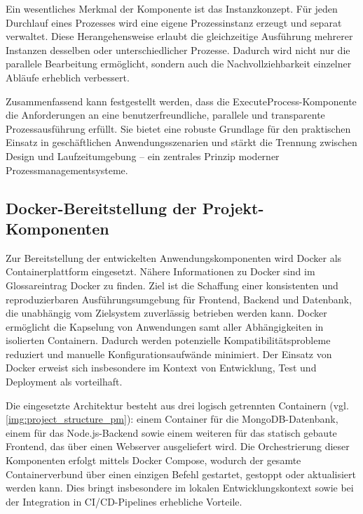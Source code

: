 Ein wesentliches Merkmal der Komponente ist das Instanzkonzept. Für jeden Durchlauf eines Prozesses wird eine eigene Prozessinstanz erzeugt und separat verwaltet. Diese Herangehensweise erlaubt die gleichzeitige Ausführung mehrerer Instanzen desselben oder unterschiedlicher Prozesse. Dadurch wird nicht nur die parallele Bearbeitung ermöglicht, sondern auch die Nachvollziehbarkeit einzelner Abläufe erheblich verbessert.

Zusammenfassend kann festgestellt werden, dass die ExecuteProcess-Komponente die Anforderungen an eine benutzerfreundliche, parallele und transparente Prozessausführung erfüllt. Sie bietet eine robuste Grundlage für den praktischen Einsatz in geschäftlichen Anwendungsszenarien und stärkt die Trennung zwischen Design und Laufzeitumgebung – ein zentrales Prinzip moderner Prozessmanagementsysteme.



\newpage
\subsection{Docker-Bereitstellung der Projekt-Komponenten} \label{docker}
Zur Bereitstellung der entwickelten Anwendungskomponenten wird Docker als Containerplattform eingesetzt. Nähere Informationen zu Docker sind im Glossareintrag \gls{Docker} zu finden. Ziel ist die Schaffung einer konsistenten und reproduzierbaren Ausführungsumgebung für Frontend, Backend und Datenbank, die unabhängig vom Zielsystem zuverlässig betrieben werden kann. Docker ermöglicht die Kapselung von Anwendungen samt aller Abhängigkeiten in isolierten Containern. Dadurch werden potenzielle Kompatibilitätsprobleme reduziert und manuelle Konfigurationsaufwände minimiert. Der Einsatz von Docker erweist sich insbesondere im Kontext von Entwicklung, Test und Deployment als vorteilhaft.

Die eingesetzte Architektur besteht aus drei logisch getrennten Containern (vgl. \autoref{img:project_structure_pm}): einem Container für die MongoDB-Datenbank, einem für das Node.js-Backend sowie einem weiteren für das statisch gebaute Frontend, das über einen Webserver ausgeliefert wird. Die Orchestrierung dieser Komponenten erfolgt mittels Docker Compose, wodurch der gesamte Containerverbund über einen einzigen Befehl gestartet, gestoppt oder aktualisiert werden kann. Dies bringt insbesondere im lokalen Entwicklungskontext sowie bei der Integration in CI/CD-Pipelines erhebliche Vorteile.

